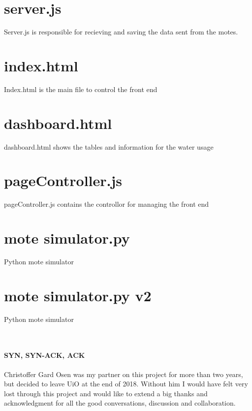 \documentclass[]{uiophd}
\begin{document}
\section{server.js}
Server.js is responsible for recieving and saving the data sent from the motes.


\section{index.html}
Index.html is the main file to control the front end


\section{dashboard.html}
dashboard.html shows the tables and information for the water usage


\section{pageController.js}
pageController.js contains the controllor for managing the front end


\section{mote simulator.py}
Python mote simulator


\section{mote simulator.py v2}
Python mote simulator

\\\\
\textbf{SYN, SYN-ACK, ACK}
\\\\
Christoffer Gard Osen was my partner on this project for more than two years, but decided to leave UiO at the end of 2018. Without him I would have felt very lost through this project and would like to extend a big thanks and acknowledgment for all the good conversations, discussion and collaboration.
\end{document}
